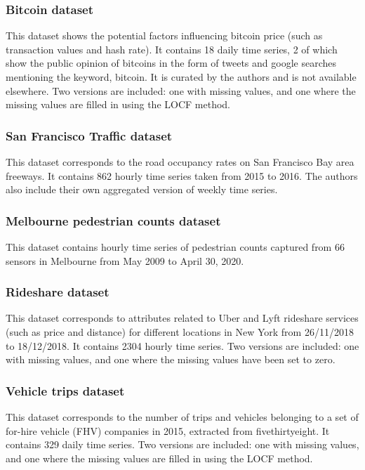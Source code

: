 \subsubsection{Bitcoin dataset}
This dataset shows the potential factors influencing bitcoin price (such as transaction values and hash rate). It contains 18 daily time series, 2 of which show the public opinion of bitcoins in the form of tweets and google searches mentioning the keyword, bitcoin. It is curated by the authors and is not available elsewhere. Two versions are included: one with missing values, and one where the missing values are filled in using the LOCF method.

\subsubsection{San Francisco Traffic dataset}
This dataset corresponds to the road occupancy rates on San Francisco Bay area freeways. It contains 862 hourly time series taken from 2015 to 2016. The authors also include their own aggregated version of weekly time series.

\subsubsection{Melbourne pedestrian counts dataset}
This dataset contains hourly time series of pedestrian counts captured from 66 sensors in Melbourne from May 2009 to April 30, 2020.

\subsubsection{Rideshare dataset}
This dataset corresponds to attributes related to Uber and Lyft rideshare services (such as price and distance) for different locations in New York from 26/11/2018 to 18/12/2018. It contains 2304 hourly time series. Two versions are included: one with missing values, and one where the missing values have been set to zero.

\subsubsection{Vehicle trips dataset}
This dataset corresponds to the number of trips and vehicles belonging to a set of for-hire vehicle (FHV) companies in 2015, extracted from fivethirtyeight. It contains 329 daily time series. Two versions are included: one with missing values, and one where the missing values are filled in using the LOCF method.

